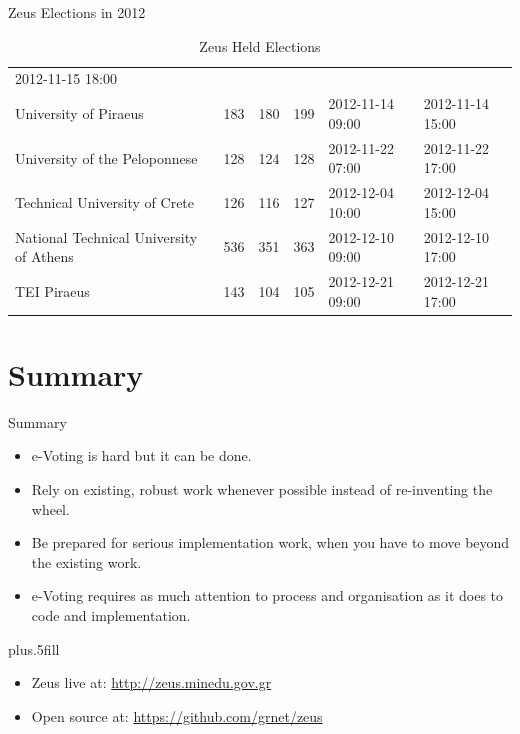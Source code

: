 \documentclass[utf8]{beamer}
\begin{document}
\begin{frame}{Zeus Elections in 2012}
{\begin{table}[t]
\begin{tabular}{p{4cm}lllll}
    2012-11-15 18:00\\
    University of Piraeus & 183 & 180 & 199 & 2012-11-14 09:00 & 
    2012-11-14 15:00\\
    University of the Peloponnese & 128 & 124 & 128 &
    2012-11-22 07:00 & 2012-11-22 17:00\\
    Technical University of Crete & 126 & 116 & 127 & 
    2012-12-04 10:00 & 2012-12-04 15:00\\
    National Technical University of Athens & 536 & 351 & 363 &
    2012-12-10 09:00 & 2012-12-10 17:00\\
    TEI Piraeus & 143 & 104 & 105 & 2012-12-21 09:00 & 2012-12-21 17:00\\
  \end{tabular}
  \caption{Zeus Held Elections\label{table:zeus-elections}}
\end{table}
}

\end{frame}

\section*{Summary}

\begin{frame}{Summary}

  \begin{itemize}
  \item
    \alert{e-Voting is hard} but it can be done.
  \item
    \alert{Rely on existing, robust work whenever possible}
    instead of re-inventing the wheel.
  \item
    \alert{Be prepared for serious implementation work},
    when you have to move beyond the existing work.
  \item
    \alert{e-Voting requires as much attention to process and
      organisation as it does to code and implementation}.

  \end{itemize}
  
  \vskip0pt plus.5fill
  \begin{itemize}
  \item Zeus live at: \url{http://zeus.minedu.gov.gr}
  \item Open source at: \url{https://github.com/grnet/zeus}
  \end{itemize}


\end{frame}
\end{document}
